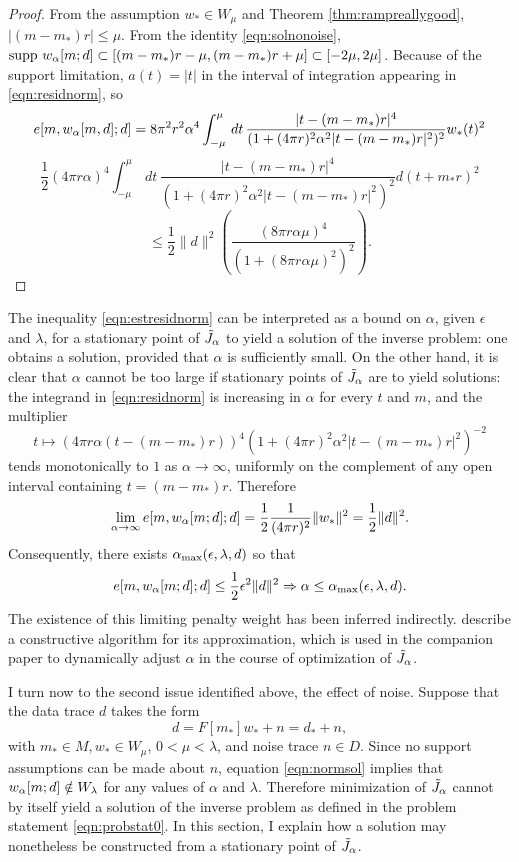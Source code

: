 \begin{proof}
  From the assumption $w_* \in W_{\mu}$ and Theorem
  \ref{thm:rampreallygood}, $|(m-m_*)r|\le \mu$. From the
  identity \ref{eqn:solnonoise},
  $\mbox{supp }w_{\alpha}[m;d] \subset
  [(m-m_*)r-\mu,(m-m_*)r+\mu] \subset
  [-2\mu,2\mu]$. Because of the support limitation, $a(t)=|t|$ in the
  interval of integration appearing in \ref{eqn:residnorm}, so
\[
  e[m,w_{\alpha}[m,d];d] 
= 8 \pi^2 r^2 \alpha^4\int^{\mu}_{-\mu}\,dt\,\frac{|t-(m-m_*)r|^4}{(1+(4\pi r)^2 \alpha^2 
|t-(m-m_*)r|^2)^{2}}w_*(t)^2
\]
\[
  \frac{1}{2} (4\pi r \alpha)^4\int^{\mu}_{-\mu}\,dt\,\frac{|t-(m-m_*)r|^4}{(1+(4\pi r)^2 \alpha^2 
|t-(m-m_*)r|^2)^{2}}d(t+m_*r)^2
\]
\[
  \le \frac{1}{2} \|d\|^2  \left(\frac{(8\pi r \alpha \mu)^4}{(1+(8\pi
      r \alpha \mu)^2)^2}\right).
  \]
\end{proof}

The inequality \ref{eqn:estresidnorm} can be interpreted as a bound 
on $\alpha$, given $\epsilon$ and $\lambda$, for a
stationary point of $\tilde{J}_{\alpha}$ to yield a solution of the inverse
problem: one obtains a solution, provided that $\alpha$ is
sufficiently small. On the other hand, it is clear that $\alpha$
cannot be too large if stationary points of $\tilde{J}_{\alpha}$ are to yield
solutions: the integrand in \ref{eqn:residnorm} is increasing in
$\alpha$ for every $t$ and $m$, and the multiplier
\[
t \mapsto (4\pi r \alpha(t-(m-m_*)r))^4(1+(4\pi r)^2 \alpha^2 
|t-(m-m_*)r|^2)^{-2}
\]
tends monotonically to $1$ as $\alpha \rightarrow \infty$, uniformly
on the complement of any open interval containing
$t=(m-m_*)r$. Therefore
\begin{equation}
  \label{eqn:elimit}
  \lim_{\alpha \rightarrow \infty}e[m,w_{\alpha}[m;d];d] =
  \frac{1}{2}\frac{1}{(4 \pi r)^2}\|w_*\|^2 = \frac{1}{2}\|d\|^2.
\end{equation}
Consequently, there exists $\alpha_{\rm max}(\epsilon,\lambda,d)$ so
that
\[
  e[m,w_{\alpha}[m;d];d]  \le \frac{1}{2}\epsilon^2\|d\|^2
  \Rightarrow \alpha \le \alpha_{\rm max}(\epsilon,\lambda,d).
\]
The existence of this limiting penalty weight has been inferred
indirectly. \cite{FuSymes2017discrepancy} describe a constructive
algorithm for its approximation, which is used in the companion paper
\cite{SymesChenMinkoff:21} to dynamically adjust $\alpha$ in the
course of optimization of $\tilde{J}_{\alpha}$.

I turn now to the second issue identified above, the effect of
noise. Suppose that the data trace $d$ takes the form
\begin{equation}
  \label{eqn:defdatanoisy}
  d = F[m_*]w_* + n = d_*+n,
\end{equation}
with $m_* \in M, w_* \in W_{\mu}$, $0<\mu<\lambda$, and noise trace $n \in
D$. Since no support assumptions can be made about $n$, equation
\ref{eqn:normsol} implies that $w_{\alpha}[m;d] \notin W_{\lambda}$ for any values of
$\alpha$ and $\lambda$.  Therefore minimization of $\tilde{J}_{\alpha}$ cannot by itself yield a
solution of the inverse problem as defined in the problem statement
\ref{eqn:probstat0}. In this section, I explain how a solution may
nonetheless be constructed from a stationary point of $\tilde{J}_{\alpha}$.

